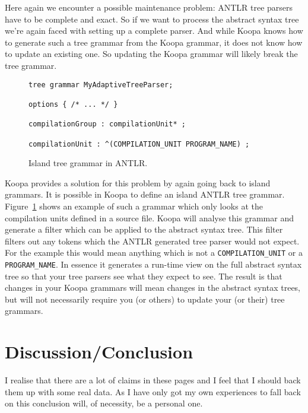 \documentclass[a4paper]{article}
\begin{document}
Here again we encounter a possible maintenance problem: ANTLR tree parsers have to be complete and exact. So if we want to process the abstract syntax tree we're again faced with setting up a complete parser. And while Koopa knows how to generate such a tree grammar from the Koopa grammar, it does not know how to update an existing one. So updating the Koopa grammar will likely break the tree grammar.

\begin{figure}
\centering
\begin{lstlisting}
tree grammar MyAdaptiveTreeParser;

options { /* ... */ }

compilationGroup : compilationUnit* ;

compilationUnit : ^(COMPILATION_UNIT PROGRAM_NAME) ;
\end{lstlisting}
\caption{Island tree grammar in ANTLR.}
\label{fig:island-tree-grammar}
\end{figure}

Koopa provides a solution for this problem by again going back to island grammars. It is possible in Koopa to define an island ANTLR tree grammar. Figure~\ref{fig:island-tree-grammar} shows an example of such a grammar which only looks at the compilation units defined in a source file. Koopa will analyse this grammar and generate a filter which can be applied to the abstract syntax tree. This filter filters out any tokens which the ANTLR generated tree parser would not expect. For the example this would mean anything which is not a \lstinline|COMPILATION_UNIT| or a \lstinline|PROGRAM_NAME|. In essence it generates a run-time view on the full abstract syntax tree so that your tree parsers see what they expect to see. The result is that changes in your Koopa grammars will mean changes in the abstract syntax trees, but will not necessarily require you (or others) to update your (or their) tree grammars.


\section{Discussion/Conclusion}
\label{conclusion}

I realise that there are a lot of claims in these pages and I feel that I should back them up with some real data. As I have only got my own experiences to fall back on this conclusion will, of necessity, be a personal one.
\end{document}
